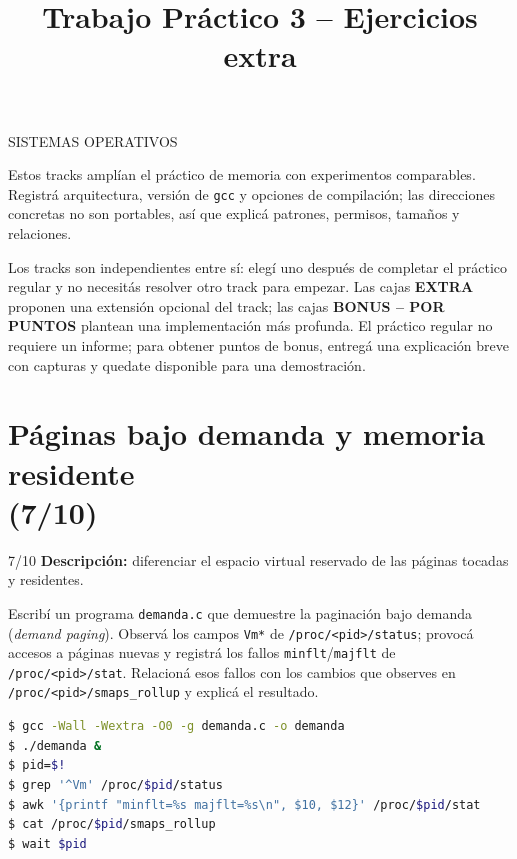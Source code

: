 \documentclass[11pt,a4paper]{article}
\title{Trabajo Práctico 3 -- Ejercicios extra}
\author{}
\date{}
\begin{document}
\renewcommand{\contentsname}{Tracks}
\maketitle
\thispagestyle{fancy}
\begin{center}
SISTEMAS OPERATIVOS
\end{center}
\newpage

\tableofcontents
\newpage

Estos tracks amplían el práctico de memoria con experimentos comparables.
Registrá arquitectura, versión de \texttt{gcc} y opciones de compilación; las
direcciones concretas no son portables, así que explicá patrones, permisos,
tamaños y relaciones.

Los tracks son independientes entre sí: elegí uno después de completar el
práctico regular y no necesitás resolver otro track para empezar. Las cajas
\textbf{EXTRA} proponen una extensión opcional del track; las cajas
\textbf{BONUS -- POR PUNTOS} plantean una implementación más profunda. El
práctico regular no requiere un informe; para obtener puntos de bonus, entregá
una explicación breve con capturas y quedate disponible para una demostración.

\newpage
\section[Páginas bajo demanda y memoria residente (7/10)]{Páginas bajo demanda y memoria residente\\[-2pt](7/10)}

\begin{trackbox}{7/10}
\textbf{Descripción:} diferenciar el espacio virtual reservado de las páginas
tocadas y residentes.
\end{trackbox}

Escribí un programa \texttt{demanda.c} que demuestre la paginación bajo
demanda (\emph{demand paging}). Observá los campos \texttt{Vm*} de
\texttt{/proc/<pid>/status}; provocá accesos a páginas nuevas y registrá los
fallos \texttt{minflt}/\texttt{majflt} de \texttt{/proc/<pid>/stat}. Relacioná
esos fallos con los cambios que observes en
\texttt{/proc/<pid>/smaps\_rollup} y explicá el resultado.

\begin{lstlisting}[language=bash]
$ gcc -Wall -Wextra -O0 -g demanda.c -o demanda
$ ./demanda &
$ pid=$!
$ grep '^Vm' /proc/$pid/status
$ awk '{printf "minflt=%s majflt=%s\n", $10, $12}' /proc/$pid/stat
$ cat /proc/$pid/smaps_rollup
$ wait $pid
\end{lstlisting}
\end{document}
